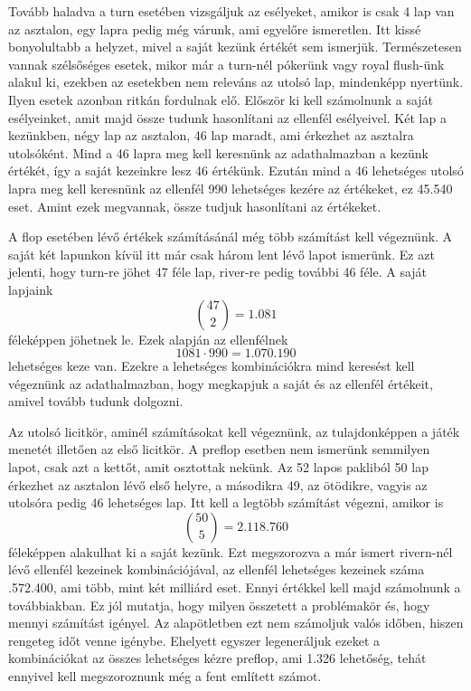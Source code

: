 Tovább haladva a turn esetében vizsgáljuk az esélyeket, amikor is csak 4 lap van az asztalon, egy lapra pedig még várunk, ami egyelőre ismeretlen. Itt kissé bonyolultabb a helyzet, mivel a saját kezünk értékét sem ismerjük. Természetesen vannak szélsőséges esetek, mikor már a turn-nél pókerünk vagy royal flush-ünk alakul ki, ezekben az esetekben nem releváns az utolsó lap, mindenképp nyertünk. Ilyen esetek azonban ritkán fordulnak elő. Először ki kell számolnunk a saját esélyeinket, amit majd össze tudunk hasonlítani az ellenfél esélyeivel. Két lap a kezünkben, négy lap az asztalon, 46 lap maradt, ami érkezhet az asztalra utolsóként. Mind a 46 lapra meg kell keresnünk az adathalmazban a kezünk értékét, így a saját kezeinkre lesz 46 értékünk. Ezután mind a 46 lehetséges utolsó lapra meg kell keresnünk az ellenfél 990 lehetséges kezére az értékeket, ez 45.540 eset. Amint ezek megvannak, össze tudjuk hasonlítani az értékeket.

A flop esetében lévő értékek számításánál még több számítást kell végeznünk. A saját két lapunkon kívül itt már csak három lent lévő lapot ismerünk. Ez azt jelenti, hogy turn-re jöhet 47 féle lap, river-re pedig további 46 féle. A saját lapjaink \[ \binom{47}{2}=1.081\] féleképpen jöhetnek le. Ezek alapján az ellenfélnek \[1081\cdot990=1.070.190\] lehetséges keze van. Ezekre a lehetséges kombinációkra mind keresést kell végeznünk az adathalmazban, hogy megkapjuk a saját és az ellenfél értékeit, amivel tovább tudunk dolgozni.

Az utolsó licitkör, aminél számításokat kell végeznünk, az tulajdonképpen a játék menetét illetően az első licitkör. A preflop esetben nem ismerünk semmilyen lapot, csak azt a kettőt, amit osztottak nekünk. Az 52 lapos pakliból 50 lap érkezhet az asztalon lévő első helyre, a másodikra 49, az ötödikre, vagyis az utolsóra pedig 46 lehetséges lap. Itt kell a legtöbb számítást végezni, amikor is \[ \binom{50}{5}=2.118.760\] féleképpen alakulhat ki a saját kezünk. Ezt megszorozva a már ismert rivern-nél lévő ellenfél kezeinek kombinációjával, az ellenfél lehetséges kezeinek száma .572.400, ami több, mint két milliárd eset. Ennyi értékkel kell majd számolnunk a továbbiakban. Ez jól mutatja, hogy milyen összetett a problémakör és, hogy mennyi számítást igényel. Az alapötletben ezt nem számoljuk valós időben, hiszen rengeteg időt venne igénybe. Ehelyett egyszer legeneráljuk ezeket a kombinációkat az összes lehetséges kézre preflop, ami 1.326 lehetőség, tehát ennyivel kell megszoroznunk még a fent említett számot.

